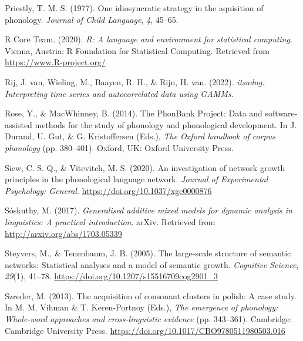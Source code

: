 \documentclass[
  man]{apa6}
\newlength{\cslhangindent}
\newlength{\cslentryspacingunit} %
\newenvironment{CSLReferences}[2] %
 {%
  \setlength{\parindent}{0pt}
  \ifodd #1
  \let\oldpar\par
  \def\par{\hangindent=\cslhangindent\oldpar}
  \fi
  \setlength{\parskip}{#2\cslentryspacingunit}
 }%
 {}
\begin{document}
\begin{CSLReferences}{1}{0}
\leavevmode{}%
Priestly, T. M. S. (1977). One idiosyncratic strategy in the aquisition of phonology. \emph{Journal of Child Language}, \emph{4}, 45--65.

\leavevmode{}%
R Core Team. (2020). \emph{R: A language and environment for statistical computing}. Vienna, Austria: R Foundation for Statistical Computing. Retrieved from \url{https://www.R-project.org/}

\leavevmode{}%
Rij, J. van, Wieling, M., Baayen, R. H., \& Rijn, H. van. (2022). \emph{{itsadug}: Interpreting time series and autocorrelated data using GAMMs}.

\leavevmode{}%
Rose, Y., \& MacWhinney, B. (2014). The {PhonBank} {Project}: {Data} and software-assisted methods for the study of phonology and phonological development. In J. Durand, U. Gut, \& G. Kristoffersen (Eds.), \emph{The {Oxford} handbook of corpus phonology} (pp. 380--401). Oxford, UK: Oxford University Press.

\leavevmode{}%
Siew, C. S. Q., \& Vitevitch, M. S. (2020). An investigation of network growth principles in the phonological language network. \emph{Journal of Experimental Psychology: General}. \url{https://doi.org/10.1037/xge0000876}

\leavevmode{}%
Sóskuthy, M. (2017). \emph{Generalised additive mixed models for dynamic analysis in linguistics: A practical introduction}. arXiv. Retrieved from \url{http://arxiv.org/abs/1703.05339}

\leavevmode{}%
Steyvers, M., \& Tenenbaum, J. B. (2005). The large-scale structure of semantic networks: Statistical analyses and a model of semantic growth. \emph{Cognitive Science}, \emph{29}(1), 41--78. \url{https://doi.org/10.1207/s15516709cog2901_3}

\leavevmode{}%
Szreder, M. (2013). The acquisition of consonant clusters in polish: A case study. In M. M. Vihman \& T. Keren-Portnoy (Eds.), \emph{The emergence of phonology: Whole-word approaches and cross-linguistic evidence} (pp. 343--361). Cambridge: Cambridge University Press. \url{https://doi.org/10.1017/CBO9780511980503.016}


\end{CSLReferences}
\end{document}
